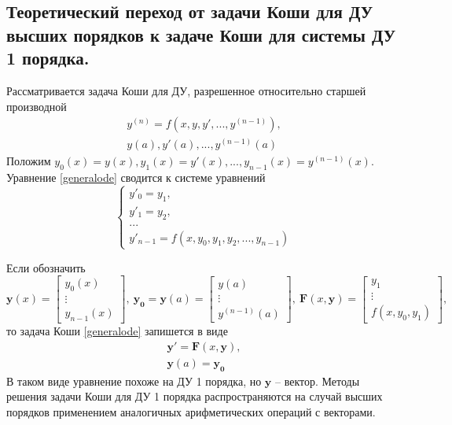 \documentclass[a4paper, 12pt]{article}
\begin{document}
	\subsection{Теоретический переход от задачи Коши для ДУ высших порядков к задаче Коши для системы ДУ 1 порядка.}
	
	Рассматривается задача Коши для ДУ, разрешенное относительно старшей производной
	\begin{equation} \label{generalode}
		\begin{gathered}
			y^{(n)} = f(x,y,y',...,y^{(n-1)}),\\
			y(a), y'(a),...,y^{(n-1)}(a)
		\end{gathered}
	\end{equation}
	Положим $y_0(x) = y(x), y_1(x)=y'(x),...,y_{n-1}(x)=y^{(n-1)}(x)$. Уравнение \eqref{generalode} сводится к системе уравнений
	\begin{equation}
		\begin{cases}
			y'_0 = y_1,\\
			y'_1 = y_2,\\
			...\\
			y'_{n-1} = f(x,y_0,y_1,y_2,...,y_{n-1})
		\end{cases}
	\end{equation}

	Если обозначить 
		\begin{equation}
			\mathbf{y}(x)=
			\begin{bmatrix}
				y_0(x)\\
				\vdots\\
				y_{n-1}(x)
			\end{bmatrix}, \  
			\mathbf{y_0}=\mathbf{y}(a)=
			\begin{bmatrix}
				y(a)\\
				\vdots\\
				y^{(n-1)}(a)
			\end{bmatrix}, \ 
			\mathbf{F}(x,\mathbf{y}) = 
			\begin{bmatrix}
				y_1\\
				\vdots\\
				f(x,y_0,y_1)
			\end{bmatrix},
		\end{equation}
	то задача Коши \eqref{generalode} запишется в виде
	\begin{equation}
		\begin{gathered}
			\mathbf{y'}=\mathbf{F}(x,\mathbf{y}),\\
			\mathbf{y}(a)=\mathbf{y_0}
		\end{gathered}
	\end{equation}
	В таком виде уравнение похоже на ДУ 1 порядка, но $\mathbf{y}$ -- вектор. Методы решения задачи Коши для ДУ 1 порядка распространяются на случай высших порядков применением аналогичных арифметических операций с векторами.
	
\end{document}
